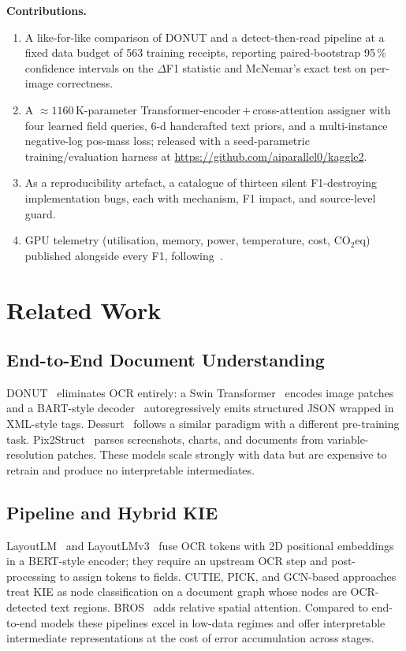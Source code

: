 \documentclass[conference]{IEEEtran}
\begin{document}
\medskip
\noindent\textbf{Contributions.}
\begin{enumerate}
\item A like-for-like comparison of DONUT and a detect-then-read
  pipeline at a fixed data budget of 563 training receipts,
  reporting paired-bootstrap 95\,\% confidence intervals on the
  $\Delta$F1 statistic and McNemar's exact test on per-image
  correctness.
\item A $\approx1160\,$K-parameter
  Transformer-encoder\,$+$\,cross-attention assigner with four
  learned field queries, 6-d handcrafted text priors, and a
  multi-instance negative-log pos-mass loss; released with a
  seed-parametric training/evaluation harness at
  \url{https://github.com/aiparallel0/kaggle2}.
\item As a reproducibility artefact, a catalogue of thirteen
  silent F1-destroying implementation bugs, each with mechanism,
  F1 impact, and source-level guard.
\item GPU telemetry (utilisation, memory, power, temperature, cost,
  CO$_2$eq) published alongside every F1, following~\cite{strubell2019energy}.
\end{enumerate}


\section{Related Work}

\subsection{End-to-End Document Understanding}
DONUT~\cite{kim2022donut} eliminates OCR entirely: a Swin
Transformer~\cite{liu2021swin} encodes image patches and a BART-style
decoder~\cite{lewis2020bart} autoregressively emits structured JSON
wrapped in XML-style tags.  Dessurt~\cite{davis2022dessurt} follows a
similar paradigm with a different pre-training task.
Pix2Struct~\cite{lee2023pix2struct} parses screenshots, charts, and
documents from variable-resolution patches.  These models scale
strongly with data but are expensive to retrain and produce no
interpretable intermediates.

\subsection{Pipeline and Hybrid KIE}
LayoutLM~\cite{xu2020layoutlm} and LayoutLMv3~\cite{huang2022layoutlmv3}
fuse OCR tokens with 2D positional embeddings in a BERT-style encoder;
they require an upstream OCR step and post-processing to assign tokens
to fields.  CUTIE, PICK, and GCN-based approaches treat KIE as node
classification on a document graph whose nodes are OCR-detected text
regions.  BROS~\cite{hong2022bros} adds relative spatial attention.
Compared to end-to-end models these pipelines excel in low-data
regimes and offer interpretable intermediate representations at the
cost of error accumulation across stages.
\end{document}
